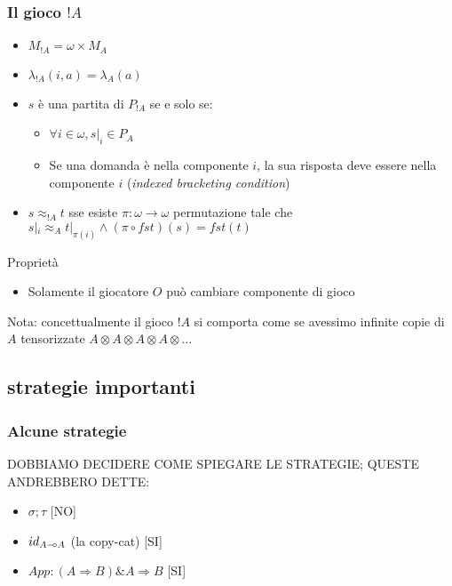 \documentclass{beamer}
\newcommand{\limp}{\mathbin{{-}\mkern-3.5mu{\circ}}}
\begin{document}
\begin{frame}
	
	\frametitle{Il gioco $!A$}
	
	\begin{itemize}
		\item $M_{!A}=\omega \times M_A$
		\item $\lambda_{!A}(i,a)=\lambda_A(a)$
		\item $s$ è una partita di $P_{!A}$ se e solo se:
		\begin{itemize}
			\item $\forall i\in \omega , s|_i \in P_A$
			\item Se una domanda è nella componente $i$, la sua risposta deve essere nella componente $i$ (\emph{indexed bracketing condition})
		\end{itemize}

		\item $s\approx_{!A} t$ sse esiste $\pi:\omega \rightarrow \omega$ permutazione tale che $s|_i \approx_A t|_{\pi(i)} \wedge (\pi \circ fst)(s)=fst(t)$
	\end{itemize}
	
	\begin{block}{Proprietà}
		\begin{itemize}
			\item Solamente il giocatore $O$ può cambiare componente di gioco
		\end{itemize}
	\end{block}
	
	Nota: concettualmente il gioco $!A$ si comporta come se avessimo infinite copie di $A$ tensorizzate $A\otimes A\otimes A\otimes A\otimes \dots$
	
\end{frame}


\begin{frame}[t]

	
	
\end{frame}

\subsection{strategie importanti}

\begin{frame}

	\frametitle{Alcune strategie}
	
	DOBBIAMO DECIDERE COME SPIEGARE LE STRATEGIE; QUESTE ANDREBBERO DETTE:
	\begin{itemize}
		\item $\sigma ; \tau$ [NO]
		\item $id_{A\limp A}$ (la copy-cat) [SI]
		\item $App:(A \Rightarrow B)\& A \Rightarrow B$ [SI]
	\end{itemize}

\end{frame}
\end{document}

